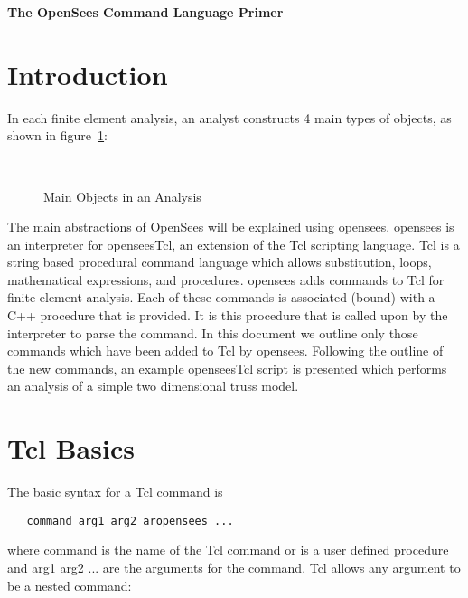 \documentclass[12pt]{article}
\begin{document}


\begin{center}
{\bf \Large The OpenSees Command Language Primer} 

\end{center}

\vspace{.2in}
\section{Introduction}

 In each finite element analysis, an analyst constructs 4 main
types of objects, as shown in figure~\ref{main}:

\begin{figure}[htpb]
\begin{center}
\leavevmode
\hbox{%
}
\end{center}
\caption{Main Objects in an Analysis}
\label{main}
\end{figure}


The main abstractions of OpenSees will be explained using opensees. opensees is an
interpreter for openseesTcl, an extension of the Tcl scripting language.
Tcl is a string based procedural command language which allows
substitution, loops, mathematical expressions, and procedures. 
opensees adds commands to Tcl for finite element analysis.
Each of these commands is associated (bound) with a C++
procedure that is provided. It is this procedure that is called upon
by the interpreter to parse the command. In this document we
outline only those commands which have been added to Tcl by
opensees. Following the outline of the new commands, an example 
openseesTcl script is presented which performs an analysis of a simple two
dimensional truss model. 

\section {Tcl Basics}
The basic syntax for a Tcl command is

{\sf\small
\begin{verbatim}
   command arg1 arg2 aropensees ...
\end{verbatim}
}

\noindent where command is the name of the Tcl command or is a user defined
procedure and arg1 arg2 ... are the arguments for the command. Tcl allows
any argument to be a nested command:
\end{document}
